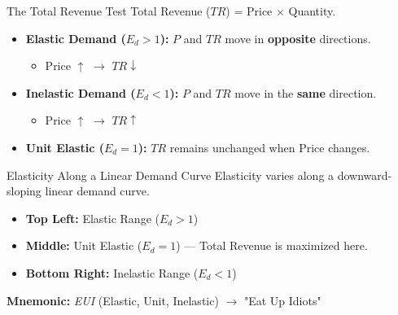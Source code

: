 \documentclass[aspectratio=169]{beamer}
\begin{document}
\begin{frame}{The Total Revenue Test}
    Total Revenue ($TR$) = Price $\times$ Quantity.
    
    \begin{itemize}
        \item \textbf{Elastic Demand ($E_d > 1$):} $P$ and $TR$ move in \textbf{opposite} directions.
        \begin{itemize}
            \item Price $\uparrow$ $\rightarrow$ $TR \downarrow$
        \end{itemize}
        \item \textbf{Inelastic Demand ($E_d < 1$):} $P$ and $TR$ move in the \textbf{same} direction.
        \begin{itemize}
            \item Price $\uparrow$ $\rightarrow$ $TR \uparrow$
        \end{itemize}
        \item \textbf{Unit Elastic ($E_d = 1$):} $TR$ remains unchanged when Price changes.
    \end{itemize}
\end{frame}

\begin{frame}{Elasticity Along a Linear Demand Curve}
    Elasticity varies along a downward-sloping linear demand curve.
    \vspace{0.5cm}
    \begin{itemize}
        \item \textbf{Top Left:} Elastic Range ($E_d > 1$)
        \item \textbf{Middle:} Unit Elastic ($E_d = 1$) — Total Revenue is maximized here.
        \item \textbf{Bottom Right:} Inelastic Range ($E_d < 1$)
    \end{itemize}
    \vspace{0.5cm}
    \textbf{Mnemonic:} \textit{EUI} (Elastic, Unit, Inelastic) $\rightarrow$ "Eat Up Idiots"
\end{frame}
\end{document}
